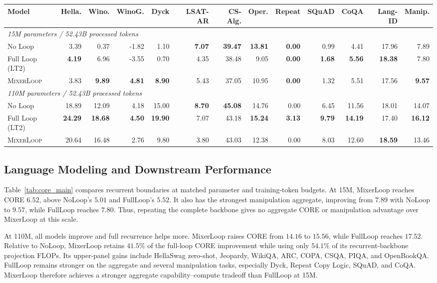 \documentclass{article}
\newcommand{\method}{\textsc{MixerLoop}}
\begin{document}
\begin{table}[t]
\begin{tabular}{lrrrrrrrrrrrr}
\toprule
Model
& Hella. & Wino. & WinoG. & Dyck & LSAT-AR
& CS-Alg. & Oper. & Repeat & SQuAD & CoQA & Lang-ID & Manip. \\
\midrule
\multicolumn{13}{l}{\textit{15M parameters / 52.43B processed tokens}} \\
No Loop
& 3.39 & 0.37 & -1.82 & 1.10 & \textbf{7.07}
& \textbf{39.47} & \textbf{13.81} & \textbf{0.00} & 0.99 & 4.41 & 17.96 & 7.89 \\
Full Loop (LT2)
& \textbf{4.19} & 6.96 & -3.55 & 0.70 & 4.35
& 38.48 & 9.05 & \textbf{0.00} & \textbf{1.68} & \textbf{5.56} & \textbf{18.38} & 7.80 \\
\method{}
& 3.83 & \textbf{9.89} & \textbf{4.81} & \textbf{8.90} & 5.43
& 37.05 & 10.95 & \textbf{0.00} & 1.32 & 5.51 & 17.56 & \textbf{9.57} \\
\midrule
\multicolumn{13}{l}{\textit{110M parameters / 52.43B processed tokens}} \\
No Loop
& 18.89 & 12.09 & 4.18 & 15.00 & \textbf{8.70}
& \textbf{45.08} & 14.76 & 0.00 & 6.45 & 11.56 & 18.01 & 14.07 \\
Full Loop (LT2)
& \textbf{24.29} & \textbf{18.68} & \textbf{4.50} & \textbf{19.90} & 7.07
& 43.18 & \textbf{15.24} & \textbf{3.13} & \textbf{9.79} & \textbf{14.19} & 17.40 & \textbf{16.12} \\
\method{}
& 20.64 & 16.48 & 2.76 & 9.80 & 3.80
& 43.03 & 12.38 & 0.00 & 8.03 & 12.60 & \textbf{18.59} & 13.46 \\
\bottomrule
\end{tabular}
\end{table}

\subsection{Language Modeling and Downstream Performance}

Table~\ref{tab:core_main} compares recurrent boundaries at matched parameter
and training-token budgets. At 15M, MixerLoop reaches CORE $6.52$, above
NoLoop's $5.01$ and FullLoop's $5.52$. It also has the strongest manipulation
aggregate, improving from $7.89$ with NoLoop to $9.57$, while FullLoop reaches
$7.80$. Thus, repeating the complete backbone gives no aggregate CORE or
manipulation advantage over MixerLoop at this scale.

At 110M, all models improve and full recurrence helps more. MixerLoop raises
CORE from $14.16$ to $15.56$, while FullLoop reaches $17.52$. Relative to
NoLoop, MixerLoop retains $41.5\%$ of the full-loop CORE improvement while
using only $54.1\%$ of its recurrent-backbone projection FLOPs. Its upper-panel
gains include HellaSwag zero-shot, Jeopardy, WikiQA, ARC, COPA, CSQA, PIQA, and
OpenBookQA. FullLoop remains stronger on the aggregate and several
manipulation tasks, especially Dyck, Repeat Copy Logic, SQuAD, and CoQA.
MixerLoop therefore achieves a stronger aggregate capability--compute tradeoff
than FullLoop at 15M.
\end{document}
